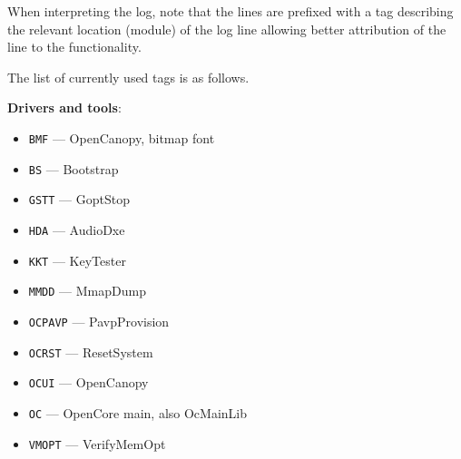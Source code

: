 \documentclass[]{article}
\providecommand{\tightlist}{%
  \setlength{\itemsep}{0pt}\setlength{\parskip}{0pt}}
\begin{document}
\begin{enumerate}
  When interpreting the log, note that the lines are prefixed with a tag describing
  the relevant location (module) of the log line allowing better attribution of the
  line to the functionality.

  The list of currently used tags is as follows.

  \textbf{Drivers and tools}:
  \begin{itemize}
  \tightlist
  \item \texttt{BMF} --- OpenCanopy, bitmap font
  \item \texttt{BS} --- Bootstrap
  \item \texttt{GSTT} --- GoptStop
  \item \texttt{HDA} --- AudioDxe
  \item \texttt{KKT} --- KeyTester
  \item \texttt{MMDD} --- MmapDump
  \item \texttt{OCPAVP} --- PavpProvision
  \item \texttt{OCRST} --- ResetSystem
  \item \texttt{OCUI} --- OpenCanopy
  \item \texttt{OC} --- OpenCore main, also OcMainLib
  \item \texttt{VMOPT} --- VerifyMemOpt
  \end{itemize}


\end{enumerate}
\end{document}
